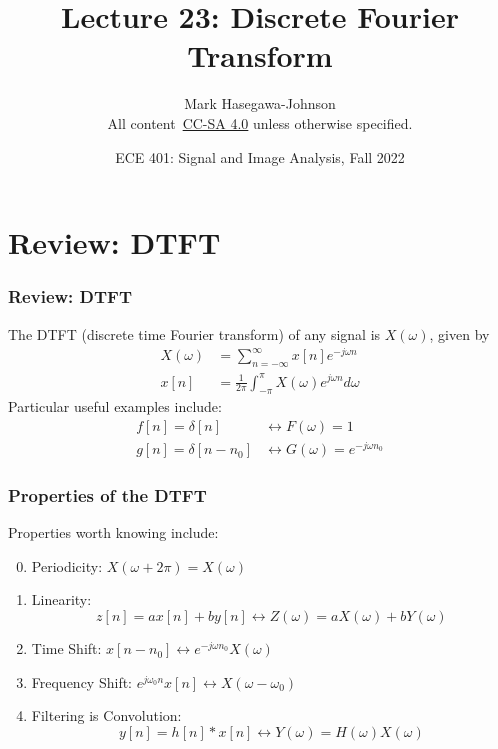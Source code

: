 \documentclass{beamer}
\title{Lecture 23: Discrete Fourier Transform}
\author{Mark Hasegawa-Johnson\\All content~\href{https://creativecommons.org/licenses/by-sa/4.0/}{CC-SA 4.0} unless otherwise specified.}
\date{ECE 401: Signal and Image Analysis, Fall 2022}
\begin{document}
\begin{frame}
  \maketitle
\end{frame}

\begin{frame}
  \tableofcontents
\end{frame}

\section[DTFT]{Review: DTFT}
\setcounter{subsection}{1}

\begin{frame}
  \frametitle{Review: DTFT}

  The DTFT (discrete time Fourier transform) of any signal is
  $X(\omega)$, given by
  \begin{align*}
    X(\omega) &= \sum_{n=-\infty}^\infty x[n]e^{-j\omega n}\\
    x[n] &= \frac{1}{2\pi}\int_{-\pi}^\pi X(\omega)e^{j\omega n}d\omega
  \end{align*}
  Particular useful examples include:
  \begin{align*}
    f[n]=\delta[n] &\leftrightarrow F(\omega)=1\\
    g[n]=\delta[n-n_0] &\leftrightarrow G(\omega)=e^{-j\omega n_0}
  \end{align*}
\end{frame}

\begin{frame}
  \frametitle{Properties of the DTFT}

  Properties worth knowing  include:
  \begin{enumerate}
    \setcounter{enumi}{-1}
  \item Periodicity: $X(\omega+2\pi)=X(\omega)$
  \item Linearity:
    \[z[n]=ax[n]+by[n]\leftrightarrow Z(\omega)=aX(\omega)+bY(\omega)
    \]
  \item Time Shift: $x[n-n_0]\leftrightarrow e^{-j\omega n_0}X(\omega)$
  \item Frequency Shift: $e^{j\omega_0 n}x[n]\leftrightarrow X(\omega-\omega_0)$
  \item Filtering is Convolution:
    \[
    y[n]=h[n]\ast x[n]\leftrightarrow Y(\omega)=H(\omega)X(\omega)
    \]
  \end{enumerate}
\end{frame}
\end{document}
